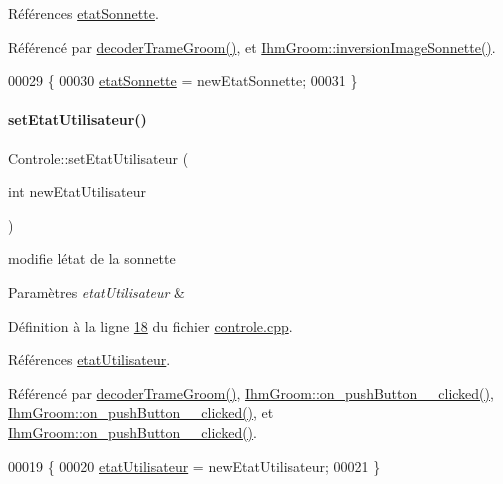 Références \hyperlink{controle_8h_source_l00070}{etat\+Sonnette}.



Référencé par \hyperlink{controle_8cpp_source_l00049}{decoder\+Trame\+Groom()}, et \hyperlink{ihmgroom_8cpp_source_l00201}{Ihm\+Groom\+::inversion\+Image\+Sonnette()}.


\begin{DoxyCode}
00029 \{
00030     \hyperlink{class_controle_afddf1dce812ff88577e308684b564f33}{etatSonnette} = newEtatSonnette;
00031 \}
\end{DoxyCode}
\mbox{\label{class_controle_a62db54114d126d03dd332332b3942320}} 
\paragraph{\texorpdfstring{set\+Etat\+Utilisateur()}{setEtatUtilisateur()}}
{\footnotesize\ttfamily Controle\+::set\+Etat\+Utilisateur (\begin{DoxyParamCaption}\item[{int}]{new\+Etat\+Utilisateur }\end{DoxyParamCaption})}



modifie l\textquotesingle{}état de la sonnette 


\begin{DoxyParams}{Paramètres}
{\em etat\+Utilisateur} & \\
\hline
\end{DoxyParams}


Définition à la ligne \hyperlink{controle_8cpp_source_l00018}{18} du fichier \hyperlink{controle_8cpp_source}{controle.\+cpp}.



Références \hyperlink{controle_8h_source_l00069}{etat\+Utilisateur}.



Référencé par \hyperlink{controle_8cpp_source_l00049}{decoder\+Trame\+Groom()}, \hyperlink{ihmgroom_8cpp_source_l00229}{Ihm\+Groom\+::on\+\_\+push\+Button\+\_\+\_\+clicked()}, \hyperlink{ihmgroom_8cpp_source_l00219}{Ihm\+Groom\+::on\+\_\+push\+Button\+\_\+\_\+clicked()}, et \hyperlink{ihmgroom_8cpp_source_l00224}{Ihm\+Groom\+::on\+\_\+push\+Button\+\_\+\_\+clicked()}.


\begin{DoxyCode}
00019 \{
00020     \hyperlink{class_controle_a690595803de8f5c172b8bc46122ebb1a}{etatUtilisateur} = newEtatUtilisateur;
00021 \}
\end{DoxyCode}
\mbox{\label{class_controle_abe472f4fd197c0fc679539e0b75a6e15}} 
